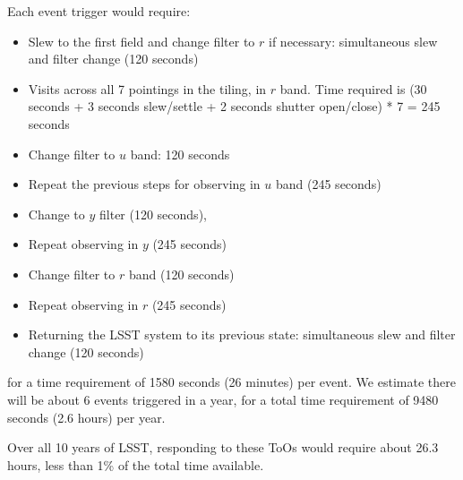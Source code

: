 \documentclass[11pt]{article}
\begin{document}
Each event trigger would require:
\begin{itemize}
\item Slew to the first field and change filter to $r$ if necessary: simultaneous slew and filter change (120 seconds) 
\item Visits across all 7 pointings in the tiling, in $r$ band. Time required is (30 seconds + 3 seconds slew/settle + 2 seconds shutter open/close) * 7 =  245 seconds
\item Change filter to $u$ band: 120 seconds 
\item Repeat the previous steps for observing in $u$ band (245 seconds)
\item Change to $y$ filter (120 seconds), 
\item Repeat observing in $y$ (245 seconds)
\item Change filter to $r$ band (120 seconds)
\item Repeat observing in $r$ (245 seconds)
\item Returning the LSST system to its previous state: simultaneous slew and filter change (120 seconds)
\end{itemize}
for a time requirement of 1580 seconds (26 minutes) per event. We estimate there will be about 6 events triggered in a year, for a total time requirement of 9480 seconds (2.6 hours) per year.

Over all 10 years of LSST, responding to these ToOs would require about 26.3 hours, less than 1\% of the total time available. 
\end{document}
